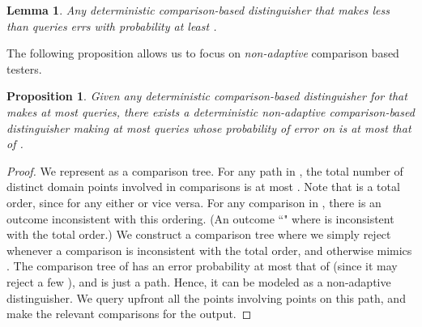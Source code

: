 \documentclass[11pt]{article}
\newtheorem{lemma}[theorem]{Lemma}
\newtheorem{proposition}[theorem]{Proposition}
\begin{document}
\begin{lemma} \label{lem:main-hard} Any deterministic comparison-based distinguisher that makes less than  queries errs
with probability at least .
\end{lemma}

\noindent
The following proposition allows us to focus on {\em non-adaptive} comparison based testers. 


\begin{proposition}	\label{prop:comp}
Given any deterministic comparison-based distinguisher  for  that makes at most  queries, there exists a deterministic {\em non-adaptive} comparison-based distinguisher  making at most  queries whose probability of error on  is at most that of .
\end{proposition}
\def\ans{{\tt ans}}
\begin{proof}
We represent  as a comparison tree. For any path in , the total number of distinct domain points involved in comparisons is at most .
Note that  is a total order, since for any  either  or vice versa.
For any comparison in , there is an outcome inconsistent with this ordering. (An outcome ``"
where  is inconsistent with the total order.)
We construct a comparison tree 
where we simply reject whenever a comparison is inconsistent with the total order, and otherwise mimics . 
The comparison tree of  has an error probability at most that of  (since it may reject a few ), and is just a path. Hence, it
can be modeled as a non-adaptive distinguisher. We query upfront all the points involving points on this path, and make the relevant comparisons
for the output.
\end{proof}





\def\v{{\tt val}}
\end{document}
